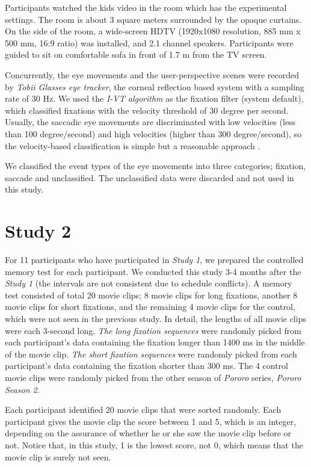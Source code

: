 \documentclass[oneside,master]{snueethesis}
\begin{document}
Participants watched the kids video in the room which has the experimental settings. The room is about 3 square meters surrounded by the opaque curtains. On the side of the room, a wide-screen HDTV (1920x1080 resolution, 885 mm x 500 mm, 16:9 ratio) was installed, and 2.1 channel speakers. Participants were guided to sit on comfortable sofa in front of 1.7 m from the TV screen.

Concurrently, the eye movements and the user-perspective scenes were recorded by \textit{Tobii Glasses eye tracker}, the corneal reflection based system with a sampling rate of 30 Hz. We used the \textit{I-VT algorithm} as the fixation filter (system default), which classified fixations with the velocity threshold of 30 degree per second. Usually, the saccadic eye movements are discriminated with low velocities (less than 100 degree/second) and high velocities (higher than 300 degree/second), so the velocity-based classification is simple but a reasonable approach \cite{Salvucci2000}.

We classified the event types of the eye movements into three categories; fixation, saccade and unclassified. The unclassified data were discarded and not used in this study.


\section{Study 2}

For 11 participants who have participated in \textit{Study 1}, we prepared the controlled memory test for each participant. We conducted this study 3-4 months after the \textit{Study 1} (the intervals are not consistent due to schedule conflicts). A memory test consisted of total 20 movie clips; 8 movie clips for long fixations, another 8 movie clips for short fixations, and the remaining 4 movie clips for the control, which were not seen in the previous study. In detail, the lengths of all movie clips were each 3-second long. \textit{The long fixation sequences} were randomly picked from each participant's data containing the fixation longer than 1400 ms in the middle of the movie clip. \textit{The short fixation sequences} were randomly picked from each participant's data containing the fixation shorter than 300 ms. The 4 control movie clips were randomly picked from the other season of \textit{Pororo} series, \textit{Pororo Season 2}.

Each participant identified 20 movie clips that were sorted randomly. Each participant gives the movie clip the score between 1 and 5, which is an integer, depending on the assurance of whether he or she saw the movie clip before or not. Notice that, in this study, 1 is the lowest score, not 0, which means that the movie clip is surely not seen.
\end{document}
